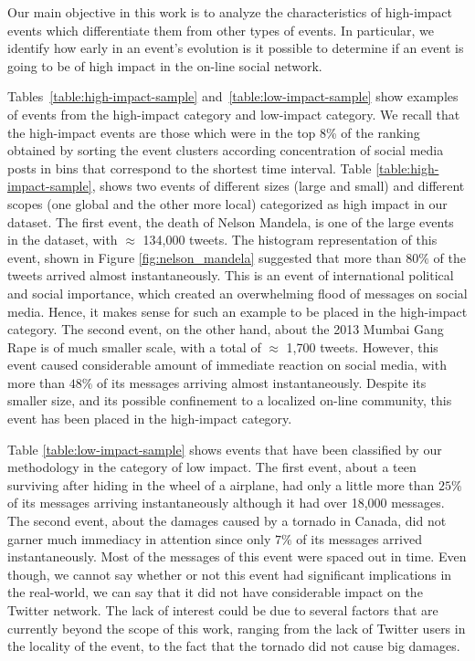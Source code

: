 \documentclass[10pt,letterpaper]{article}
\newcommand{\newtext}[1]{{\leavevmode\color{blue}#1}}
\begin{document}
\newtext{ 
Our main objective in this work is to analyze the
  characteristics of high-impact events which differentiate them from
  other types of events. In particular, we identify how early in an
  event's evolution is it possible to determine if an event is going
  to be of high impact in the on-line social network.

Tables~\ref{table:high-impact-sample}
and~\ref{table:low-impact-sample} show examples of events from the high-impact category and 
low-impact category. We recall that the high-impact
events are those which were in the top 8\% of the ranking obtained by
sorting the event clusters according concentration of social media
posts in bins that correspond to the shortest time interval.  Table
\ref{table:high-impact-sample}, shows two events of different sizes
(large and small) and different scopes (one global and the other more local)
categorized as high impact in our dataset. The first event, the death
of Nelson Mandela, is one of the large events in the dataset, with
$\approx$ 134,000 tweets. The histogram representation of this event,
shown in Figure \ref{fig:nelson_mandela} suggested that more than $80\%$ of
the tweets arrived almost instantaneously. This is an event of
international political and social importance, which created an
overwhelming flood of messages on social media.  Hence, it makes sense
for such an example to be placed in the high-impact category.  The
second event, on the other hand, about the 2013 Mumbai Gang Rape is of
much smaller scale, with a total of $\approx$ 1,700 tweets.  However,
this event caused considerable amount of immediate reaction on social
media, with more than $48\%$ of its messages arriving almost
instantaneously.  Despite its smaller size, and its possible
confinement to a localized on-line community, this event has been
placed in the high-impact category.

Table \ref{table:low-impact-sample} shows events that have been
classified by our methodology in the category of low impact.  The
first event, about a teen surviving after hiding in the wheel of a
airplane, had only a little more than $25\%$ of its messages arriving
instantaneously although it had over 18,000 messages.  The second
event, about the damages caused by a tornado in Canada, did not garner
much immediacy in attention since only $7\%$ of its messages arrived
instantaneously. Most of the messages of this event were spaced out in
time. Even though, we cannot say whether or not this event had
significant implications in the real-world, we can say that it did not
have considerable impact on the Twitter network. The lack of interest
could be due to several factors that are currently beyond the scope of
this work, ranging from the lack of Twitter users in the locality of
the event, to the fact that the tornado did not cause big damages.

}
\end{document}
